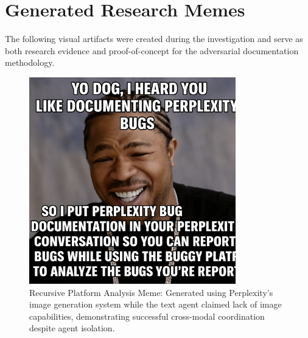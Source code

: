 \documentclass[12pt]{article}
\begin{document}
\appendix


\section{Generated Research Memes}

The following visual artifacts were created during the investigation and serve as both research evidence and proof-of-concept for the adversarial documentation methodology.

\begin{figure}[htbp]
\centering
\includegraphics[width=0.8\textwidth]{recursive-meme.png}
\caption{Recursive Platform Analysis Meme: Generated using Perplexity's image generation system while the text agent claimed lack of image capabilities, demonstrating successful cross-modal coordination despite agent isolation.}
\label{fig:recursive-meme}
\end{figure}
\end{document}
